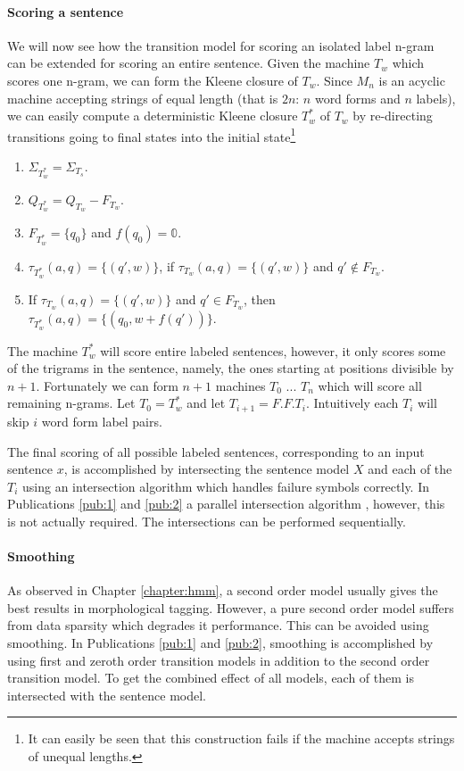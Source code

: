 \paragraph{Scoring a sentence} We will now see how the transition
model for scoring an isolated label n-gram can be extended for scoring
an entire sentence. Given the machine $T_w$ which scores one n-gram,
we can form the Kleene closure of $T_w$. Since $M_n$ is an acyclic
machine accepting strings of equal length (that is $2n$: $n$ word
forms and $n$ labels), we can easily compute a deterministic Kleene
closure $T_{w}^*$ of $T_w$ by re-directing transitions going to final
states into the initial state\footnote{It can easily be seen that this
  construction fails if the machine accepts strings of unequal
  lengths.}
\begin{enumerate}
\item $\Sigma_{T_w^*} = \Sigma_{T_s}$. 
\item $Q_{T_w^*} = Q_{T_w} - F_{T_w}$.
\item $F_{T_w^*} = \{q_0\}$ and $f(q_0) = \mathbb{0}$.
\item $\tau_{T_w^*}(a,q) = \{(q', w)\}$, if $\tau_{T_w}(a,q) = \{(q',
  w)\}$ and $q'\notin F_{T_w}$.
\item If $\tau_{T_w}(a,q) = \{(q', w)\}$ and $q' \in F_{T_w}$, then
  $\tau_{T_w^*}(a,q) = \{(q_0, w + f(q'))\}$.
\end{enumerate}

The machine $T_{w}^*$ will score entire labeled sentences, however, it
only scores some of the trigrams in the sentence, namely, the ones
starting at positions divisible by $n+1$. Fortunately we can form $n +
1$ machines $T_0$ ... $T_n$ which will score all remaining
n-grams. Let $T_0 = T_{w}^*$ and let $T_{i+1} = F.F.T_i$. Intuitively
each $T_i$ will skip $i$ word form label pairs.

The final scoring of all possible labeled sentences, corresponding to
an input sentence $x$, is accomplished by intersecting the sentence
model $X$ and each of the $T_i$ using an intersection algorithm which
handles failure symbols correctly. In Publications \ref{pub:1} and
\ref{pub:2} a parallel intersection algorithm \citep{Silfverberg2009},
however, this is not actually required. The intersections can be
performed sequentially.

\paragraph{Smoothing} As observed in Chapter \ref{chapter:hmm}, a
second order model usually gives the best results in morphological
tagging. However, a pure second order model suffers from data sparsity
which degrades it performance. This can be avoided using smoothing. In
Publications \ref{pub:1} and \ref{pub:2}, smoothing is accomplished by
using first and zeroth order transition models in addition to the
second order transition model. To get the combined effect of all
models, each of them is intersected with the sentence model.

